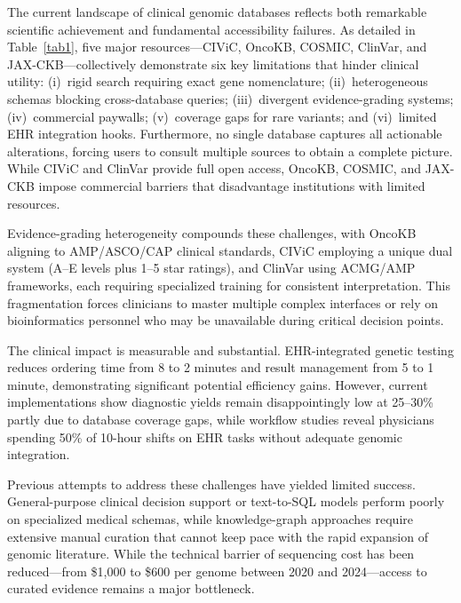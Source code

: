 The current landscape of clinical genomic databases reflects both remarkable scientific achievement and fundamental accessibility failures. As detailed in Table~\ref{tab1}, five major resources---CIViC, OncoKB, COSMIC, ClinVar, and JAX-CKB---collectively demonstrate six key limitations that hinder clinical utility: (i)~rigid search requiring exact gene nomenclature; (ii)~heterogeneous schemas blocking cross-database queries; (iii)~divergent evidence-grading systems; (iv)~commercial paywalls; (v)~coverage gaps for rare variants; and (vi)~limited EHR integration hooks. Furthermore, no single database captures all actionable alterations, forcing users to consult multiple sources to obtain a complete picture. While CIViC\cite{bib2,bib3} and ClinVar\cite{bib8,bib9} provide full open access, OncoKB\cite{bib1}, COSMIC\cite{bib10}, and JAX-CKB\cite{bib11} impose commercial barriers that disadvantage institutions with limited resources.

Evidence-grading heterogeneity compounds these challenges, with OncoKB aligning to AMP/ASCO/CAP clinical standards, CIViC employing a unique dual system (A--E levels plus 1--5 star ratings), and ClinVar using ACMG/AMP frameworks\cite{bib12}, each requiring specialized training for consistent interpretation. This fragmentation forces clinicians to master multiple complex interfaces or rely on bioinformatics personnel who may be unavailable during critical decision points.

The clinical impact is measurable and substantial. EHR-integrated genetic testing reduces ordering time from 8 to 2 minutes and result management from 5 to 1 minute\cite{bib13}, demonstrating significant potential efficiency gains. However, current implementations show diagnostic yields remain disappointingly low at 25--30\% partly due to database coverage gaps\cite{bib14}, while workflow studies reveal physicians spending 50\% of 10-hour shifts on EHR tasks without adequate genomic integration\cite{bib15}.

Previous attempts to address these challenges have yielded limited success. General-purpose clinical decision support or text-to-SQL models perform poorly on specialized medical schemas, while knowledge-graph approaches require extensive manual curation that cannot keep pace with the rapid expansion of genomic literature\cite{bib3}. While the technical barrier of sequencing cost has been reduced---from \$1,000 to \$600 per genome between 2020 and 2024---access to curated evidence remains a major bottleneck.

